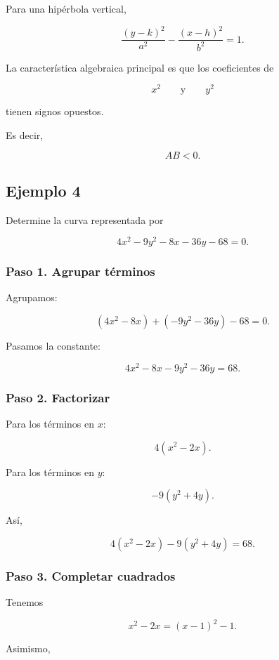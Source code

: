 \documentclass[12pt]{article}
\begin{document}
{Para una hipérbola vertical,

\[
\boxed{
\frac{(y-k)^2}{a^2}
-
\frac{(x-h)^2}{b^2}
=1.
}
\]

La característica algebraica principal es que los coeficientes de

\[
x^2
\qquad\text{y}\qquad
y^2
\]

tienen signos opuestos.

Es decir,

\[
\boxed{
AB<0.
}
\]

\subsection{Ejemplo 4}

Determine la curva representada por

\[
4x^2-9y^2-8x-36y-68=0.
\]

\subsubsection*{Paso 1. Agrupar términos}

Agrupamos:

\[
(4x^2-8x)+(-9y^2-36y)-68=0.
\]

Pasamos la constante:

\[
4x^2-8x-9y^2-36y=68.
\]

\subsubsection*{Paso 2. Factorizar}

Para los términos en \(x\):

\[
4(x^2-2x).
\]

Para los términos en \(y\):

\[
-9(y^2+4y).
\]

Así,

\[
4(x^2-2x)-9(y^2+4y)=68.
\]

\subsubsection*{Paso 3. Completar cuadrados}

Tenemos

\[
x^2-2x
=
(x-1)^2-1.
\]

Asimismo,

}
\end{document}
